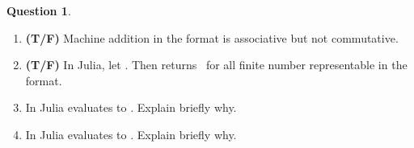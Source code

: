 \documentclass[10pt]{article}
\theoremstyle{definition}
\newtheorem{question}{Question}
\theoremstyle{remark}
\theoremstyle{plain}%
\begin{document}
\begin{question}
\begin{enumerate}
        \item
            \textbf{(T/F)}
            Machine addition in the  format is associative but not commutative.

        \item
            \textbf{(T/F)}
            In Julia, let .
            Then  returns~ for all finite number  representable in the  format.

        \item
             In Julia  evaluates to .
             Explain briefly why.
             \vspace{1.7cm}

        \item
             In Julia  evaluates to .
             Explain briefly why.
             \vspace{1.7cm}
    \end{enumerate}
\end{question}
\end{document}
